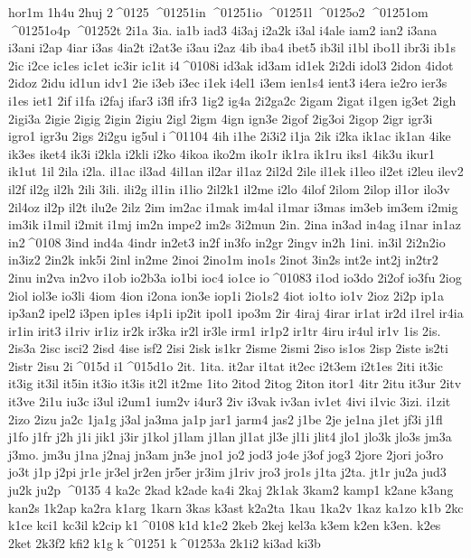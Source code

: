 {hor1m
1h4u
2huj
2^^^^0125
^^^^01251in
^^^^01251io
^^^^01251l
^^^^0125o2
^^^^01251om
^^^^01251o4p
^^^^01252t
2i1a
3ia.
ia1b
iad3
4i3aj
i2a2k
i3al
i4ale
iam2
ian2
i3ana
i3ani
i2ap
4iar
i3as
4ia2t
i2at3e
i3au
i2az
4ib
iba4
ibet5
ib3il
i1bl
ibo1l
ibr3i
ib1s
2ic
i2ce
ic1es
ic1et
ic3ir
ic1it
i4^^^^0108i
id3ak
id3am
id1ek
2i2di
idol3
2idon
4idot
2idoz
2idu
id1un
idv1
2ie
i3eb
i3ec
i1ek
i4el1
i3em
ien1s4
ient3
i4era
ie2ro
ier3s
i1es
iet1
2if
i1fa
i2faj
ifar3
i3fl
ifr3
1ig2
ig4a
2i2ga2c
2igam
2igat
i1gen
ig3et
2igh
2igi3a
2igie
2igig
2igin
2igiu
2igl
2igm
4ign
ign3e
2igof
2ig3oi
2igop
2igr
igr3i
igro1
igr3u
2igs
2i2gu
ig5ul
i^^^^01104
4ih
i1he
2i3i2
i1ja
2ik
i2ka
ik1ac
ik1an
4ike
ik3es
iket4
ik3i
i2kla
i2kli
i2ko
4ikoa
iko2m
iko1r
ik1ra
ik1ru
iks1
4ik3u
ikur1
ik1ut
1il
2ila
i2la.
il1ac
il3ad
4il1an
il2ar
il1az
2il2d
2ile
il1ek
i1leo
il2et
i2leu
ilev2
il2f
il2g
il2h
2ili
3ili.
ili2g
il1in
i1lio
2il2k1
il2me
i2lo
4ilof
2ilom
2ilop
il1or
ilo3v
2il4oz
il2p
il2t
ilu2e
2ilz
2im
im2ac
i1mak
im4al
i1mar
i3mas
im3eb
im3em
i2mig
im3ik
i1mil
i2mit
i1mj
im2n
impe2
im2s
3i2mun
2in.
2ina
in3ad
in4ag
i1nar
in1az
in2^^^^0108
3ind
ind4a
4indr
in2et3
in2f
in3fo
in2gr
2ingv
in2h
1ini.
in3il
2i2n2io
in3iz2
2in2k
ink5i
2inl
in2me
2inoi
2ino1m
ino1s
2inot
3in2s
int2e
int2j
in2tr2
2inu
in2va
in2vo
i1ob
io2b3a
io1bi
ioc4
io1ce
io^^^^01083
i1od
io3do
2i2of
io3fu
2iog
2iol
iol3e
io3li
4iom
4ion
i2ona
ion3e
iop1i
2io1s2
4iot
io1to
io1v
2ioz
2i2p
ip1a
ip3an2
ipel2
i3pen
ip1es
i4p1i
ip2it
ipol1
ipo3m
2ir
4iraj
4irar
ir1at
ir2d
i1rel
ir4ia
ir1in
irit3
i1riv
ir1iz
ir2k
ir3ka
ir2l
ir3le
irm1
ir1p2
ir1tr
4iru
ir4ul
ir1v
1is
2is.
2is3a
2isc
isci2
2isd
4ise
isf2
2isi
2isk
is1kr
2isme
2ismi
2iso
is1os
2isp
2iste
is2ti
2istr
2isu
2i^^^^015d
i1^^^^015d1o
2it.
1ita.
it2ar
i1tat
it2ec
i2t3em
i2t1es
2iti
it3ic
it3ig
it3il
it5in
it3io
it3is
it2l
it2me
1ito
2itod
2itog
2iton
itor1
4itr
2itu
it3ur
2itv
it3ve
2i1u
iu3c
i3ul
i2um1
ium2v
i4ur3
2iv
i3vak
iv3an
iv1et
4ivi
i1vic
3izi.
i1zit
2izo
2izu
ja2c
1ja1g
j3al
ja3ma
ja1p
jar1
jarm4
jas2
j1be
2je
je1na
j1et
jf3i
j1fl
j1fo
j1fr
j2h
j1i
jik1
j3ir
j1kol
j1lam
j1lan
jl1at
jl3e
jl1i
jlit4
jlo1
jlo3k
jlo3s
jm3a
j3mo.
jm3u
j1na
j2naj
jn3am
jn3e
jno1
jo2
jod3
jo4e
j3of
jog3
2jore
2jori
jo3ro
jo3t
j1p
j2pi
jr1e
jr3el
jr2en
jr5er
jr3im
j1riv
jro3
jro1s
j1ta
j2ta.
jt1r
ju2a
jud3
ju2k
ju2p
^^^^0135 4
ka2c
2kad
k2ade
ka4i
2kaj
2k1ak
3kam2
kamp1
k2ane
k3ang
kan2s
1k2ap
ka2ra
k1arg
1karn
3kas
k3ast
k2a2ta
1kau
1ka2v
1kaz
ka1zo
k1b
2kc
k1ce
kci1
kc3il
k2cip
k1^^^^0108
k1d
k1e2
2keb
2kej
kel3a
k3em
k2en
k3en.
k2es
2ket
2k3f2
kfi2
k1g
k^^^^01251
k^^^^01253a
2k1i2
ki3ad
ki3b
}
